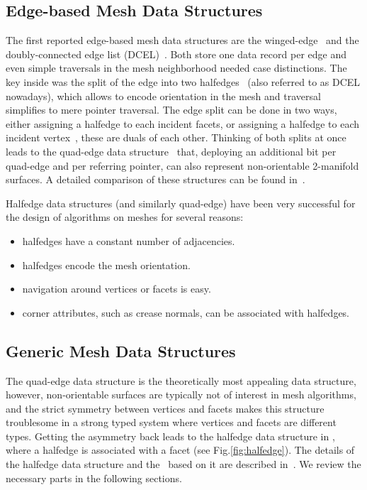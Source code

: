 \subsection{Edge-based Mesh Data Structures}

The first reported edge-based mesh data structures are the
winged-edge~\cite{Baumgart:1975:PRCV} and the doubly-connected edge
list (DCEL)~\cite{Muller78}. Both store one data record per edge and
even simple traversals in the mesh neighborhood needed case
distinctions. The key inside was the split of the edge into two
halfedges~\cite{Weiler85,Maentylae88} (also referred to as DCEL
nowadays), which allows to encode orientation in the mesh and
traversal simplifies to mere pointer traversal. The edge
split can be done in two ways, either assigning a halfedge to each
incident facets, or assigning a halfedge to each incident
vertex~\cite{Weiler85}, these are duals of each other. Thinking of
both splits at once leads to the quad-edge data 
structure~\cite{Guibas:1983:PMG} that, deploying an additional bit per
quad-edge and per referring pointer, can also represent non-orientable
2-manifold surfaces. A detailed comparison of these structures can be
found in~\cite{k-ugpdd-99}.

Halfedge data structures (and similarly quad-edge) have been very
successful for the design of algorithms on meshes for several reasons:
\begin{itemize}
\item halfedges have a constant number of adjacencies. 
\item halfedges encode the mesh orientation.
\item navigation around vertices or facets is easy.
\item corner attributes, such as crease normals, can be associated
      with halfedges.
\end{itemize}


\subsection{Generic Mesh Data Structures}

The quad-edge data structure is the theoretically most appealing data
structure, however, non-orientable surfaces are typically not of interest in
mesh algorithms, and the strict symmetry between vertices and facets
makes this structure troublesome in a strong typed system where
vertices and facets are different types. Getting the asymmetry back
leads to the halfedge data structure in \cgal, where a halfedge is 
associated with a facet (see Fig.\ref{fig:halfedge}). The details
of the halfedge data structure and the \cgalpoly\ based on it are
described in~\cite{k-ugpdd-99}. We review the necessary parts in the
following sections.

